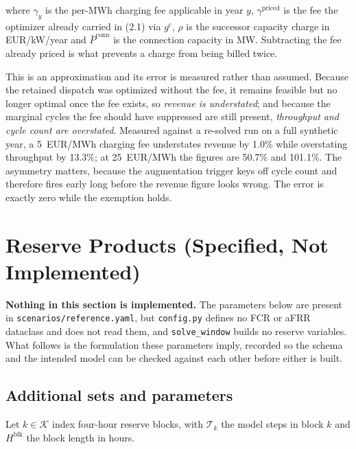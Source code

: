 \documentclass[11pt,a4paper]{article}
\numberwithin{equation}{section}
\begin{document}
where $\gamma_y$ is the per-MWh charging fee applicable in year $y$,
$\gamma^{\text{priced}}$ is the fee the optimizer already carried in (2.1) via
$g^{c}$, $\rho$ is the successor capacity charge in EUR/kW/year and
$\bar{P}^{\text{conn}}$ is the connection capacity in MW. Subtracting the fee
already priced is what prevents a charge from being billed twice.

This is an approximation and its error is measured rather than assumed. Because
the retained dispatch was optimized without the fee, it remains feasible but no
longer optimal once the fee exists, so \emph{revenue is understated}; and
because the marginal cycles the fee should have suppressed are still present,
\emph{throughput and cycle count are overstated}. Measured against a re-solved
run on a full synthetic year, a 5~EUR/MWh charging fee understates revenue by
1.0\% while overstating throughput by 13.3\%; at 25~EUR/MWh the figures are
50.7\% and 101.1\%. The asymmetry matters, because the augmentation trigger keys
off cycle count and therefore fires early long before the revenue figure looks
wrong. The error is exactly zero while the exemption holds.

\section{Reserve Products (Specified, Not Implemented)}

\textbf{Nothing in this section is implemented.} The parameters below are
present in \nolinkurl{scenarios/reference.yaml}, but \nolinkurl{config.py} defines no
FCR or aFRR dataclass and does not read them, and \nolinkurl{solve_window} builds
no reserve variables. What follows is the formulation these parameters imply,
recorded so the schema and the intended model can be checked against each other
before either is built.

\subsection{Additional sets and parameters}

Let $k \in \mathcal{K}$ index four-hour reserve blocks, with $\mathcal{T}_k$ the
model steps in block $k$ and $H^{\text{blk}}$ the block length in hours.
\end{document}
